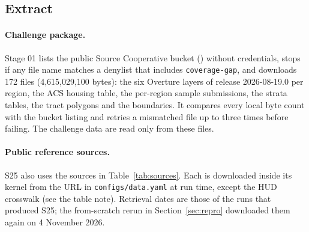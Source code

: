 \documentclass[11pt]{article}
\begin{document}
\subsection{Extract}
\label{sec:extract}

\paragraph{Challenge package.} Stage 01 lists the public Source Cooperative
bucket () without credentials, stops
if any file name matches a denylist that includes \texttt{coverage-gap}, and
downloads 172 files (4,615,029,100 bytes): the six Overture layers of release
2026-08-19.0 per region, the ACS housing table, the per-region sample
submissions, the strata tables, the tract polygons and the boundaries. It
compares every local byte count with the bucket listing and retries a
mismatched file up to three times before failing. The challenge data are
read only from these files.

\paragraph{Public reference sources.} S25 also uses the sources in
Table~\ref{tab:sources}. Each is downloaded inside its kernel from the URL in
\texttt{configs/data.yaml} at run time, except the HUD crosswalk (see the
table note). Retrieval dates are those of the runs that produced S25; the
from-scratch rerun in Section~\ref{sec:repro} downloaded them again on 4
November 2026.
\end{document}
